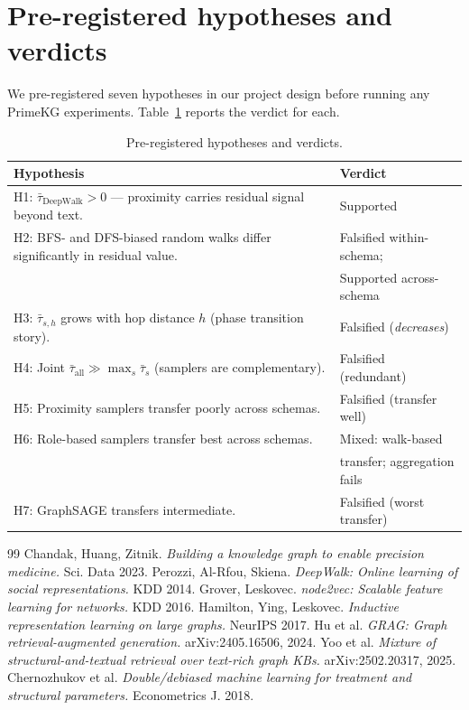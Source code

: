 \documentclass[11pt]{article}
\begin{document}
\section*{Pre-registered hypotheses and verdicts}

We pre-registered seven hypotheses in our project design before running any PrimeKG experiments. Table~\ref{tab:verdicts} reports the verdict for each.

\begin{table}[h!]
\centering
\caption{Pre-registered hypotheses and verdicts.}
\label{tab:verdicts}
\small
\begin{tabular}{p{} l}
\toprule
Hypothesis & Verdict \\
\midrule
H1: $\bar\tau_{\mathrm{DeepWalk}} > 0$ — proximity carries residual signal beyond text. & Supported \\
H2: BFS- and DFS-biased random walks differ significantly in residual value. & Falsified within-schema; \\
& Supported across-schema \\
H3: $\bar\tau_{s,h}$ grows with hop distance $h$ (phase transition story). & Falsified (\emph{decreases}) \\
H4: Joint $\bar\tau_{\mathrm{all}} \gg \max_s \bar\tau_s$ (samplers are complementary). & Falsified (redundant) \\
H5: Proximity samplers transfer poorly across schemas. & Falsified (transfer well) \\
H6: Role-based samplers transfer best across schemas. & Mixed: walk-based \\
& transfer; aggregation fails \\
H7: GraphSAGE transfers intermediate. & Falsified (worst transfer) \\
\bottomrule
\end{tabular}
\end{table}

\begin{thebibliography}{99}
 Chandak, Huang, Zitnik. \textit{Building a knowledge graph to enable precision medicine.} Sci. Data 2023.
 Perozzi, Al-Rfou, Skiena. \textit{DeepWalk: Online learning of social representations.} KDD 2014.
 Grover, Leskovec. \textit{node2vec: Scalable feature learning for networks.} KDD 2016.
 Hamilton, Ying, Leskovec. \textit{Inductive representation learning on large graphs.} NeurIPS 2017.
 Hu et al. \textit{GRAG: Graph retrieval-augmented generation.} arXiv:2405.16506, 2024.
 Yoo et al. \textit{Mixture of structural-and-textual retrieval over text-rich graph KBs.} arXiv:2502.20317, 2025.
 Chernozhukov et al. \textit{Double/debiased machine learning for treatment and structural parameters.} Econometrics J. 2018.
\end{thebibliography}
\end{document}
